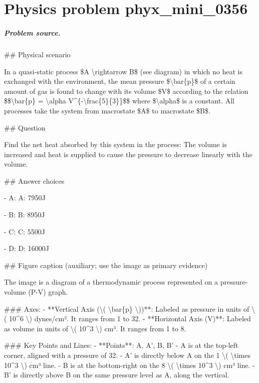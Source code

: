 
\chapter{Physics problem phyx\_mini\_0356}
\label{ch:PhyXMiniProblems_problem_phyx_mini_0356}

\paragraph{Problem source.}
\#\# Physical scenario

In a quasi-static process \$A \textbackslash{}rightarrow B\$ (see diagram) in which no heat is exchanged with the environment, the mean pressure \$\textbackslash{}bar\{p\}\$ of a certain amount of gas is found to change with its volume \$V\$ according to the relation \$\$\textbackslash{}bar\{p\} = \textbackslash{}alpha V\textasciicircum{}\{-\textbackslash{}frac\{5\}\{3\}\}\$\$ where \$\textbackslash{}alpha\$ is a constant.  All processes take the system from macrostate \$A\$ to macrostate \$B\$.

\#\# Question

Find the net heat absorbed by this system in the process: The volume is increased and heat is supplied to cause the pressure to decrease linearly with the volume.

\#\# Answer choices

- A: A: 7950J

- B: B: 8950J

- C: C: 5500J

- D: D: 16000J

\#\# Figure caption (auxiliary; use the image as primary evidence)

The image is a diagram of a thermodynamic process represented on a pressure-volume (P-V) graph. 

\#\#\# Axes:
- **Vertical Axis (\textbackslash{}( \textbackslash{}bar\{p\} \textbackslash{}))**: Labeled as pressure in units of \textbackslash{}( 10\textasciicircum{}6 \textbackslash{}) dynes/cm². It ranges from 1 to 32.
- **Horizontal Axis (V)**: Labeled as volume in units of \textbackslash{}( 10\textasciicircum{}3 \textbackslash{}) cm³. It ranges from 1 to 8.

\#\#\# Key Points and Lines:
- **Points**: A, A', B, B'
  - A is at the top-left corner, aligned with a pressure of 32.
  - A' is directly below A on the 1 \textbackslash{}( \textbackslash{}times 10\textasciicircum{}3 \textbackslash{}) cm³ line.
  - B is at the bottom-right on the 8 \textbackslash{}( \textbackslash{}times 10\textasciicircum{}3 \textbackslash{}) cm³ line.
  - B' is directly above B on the same pressure level as A, along the vertical.
  
